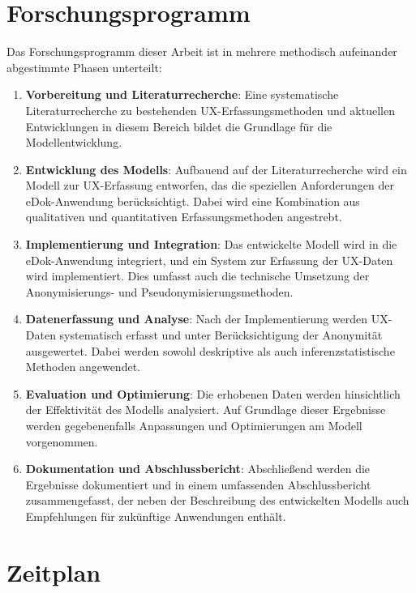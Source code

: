 \documentclass[12pt,a4paper]{article}
\begin{document}
\newpage
\section*{Forschungsprogramm}

\noindent
Das Forschungsprogramm dieser Arbeit ist in mehrere methodisch aufeinander abgestimmte Phasen unterteilt:

\begin{enumerate}[label=\arabic*.]
    \item \textbf{Vorbereitung und Literaturrecherche}: Eine systematische Literaturrecherche zu bestehenden UX-Erfassungsmethoden und aktuellen Entwicklungen in diesem Bereich bildet die Grundlage für die Modellentwicklung.
    \item \textbf{Entwicklung des Modells}: Aufbauend auf der Literaturrecherche wird ein Modell zur UX-Erfassung entworfen, das die speziellen Anforderungen der eDok-Anwendung berücksichtigt. Dabei wird eine Kombination aus qualitativen und quantitativen Erfassungsmethoden angestrebt.
    \item \textbf{Implementierung und Integration}: Das entwickelte Modell wird in die eDok-Anwendung integriert, und ein System zur Erfassung der UX-Daten wird implementiert. Dies umfasst auch die technische Umsetzung der Anonymisierungs- und Pseudonymisierungsmethoden.
    \item \textbf{Datenerfassung und Analyse}: Nach der Implementierung werden UX-Daten systematisch erfasst und unter Berücksichtigung der Anonymität ausgewertet. Dabei werden sowohl deskriptive als auch inferenzstatistische Methoden angewendet.
    \item \textbf{Evaluation und Optimierung}: Die erhobenen Daten werden hinsichtlich der Effektivität des Modells analysiert. Auf Grundlage dieser Ergebnisse werden gegebenenfalls Anpassungen und Optimierungen am Modell vorgenommen.
    \item \textbf{Dokumentation und Abschlussbericht}: Abschließend werden die Ergebnisse dokumentiert und in einem umfassenden Abschlussbericht zusammengefasst, der neben der Beschreibung des entwickelten Modells auch Empfehlungen für zukünftige Anwendungen enthält.
\end{enumerate}

\newpage
\section*{Zeitplan}
\end{document}
